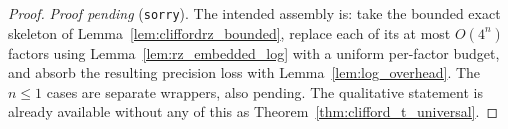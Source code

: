 \begin{proof}
  \emph{Proof pending} (\texttt{sorry}).  The intended assembly is: take the
  bounded exact skeleton of Lemma~\ref{lem:cliffordrz_bounded}, replace each of
  its at most $O(4^n)$ factors using Lemma~\ref{lem:rz_embedded_log} with a
  uniform per-factor budget, and absorb the resulting precision loss with
  Lemma~\ref{lem:log_overhead}.  The $n \le 1$ cases are separate wrappers,
  also pending.  The qualitative statement is already available without any of
  this as Theorem~\ref{thm:clifford_t_universal}.
\end{proof}
